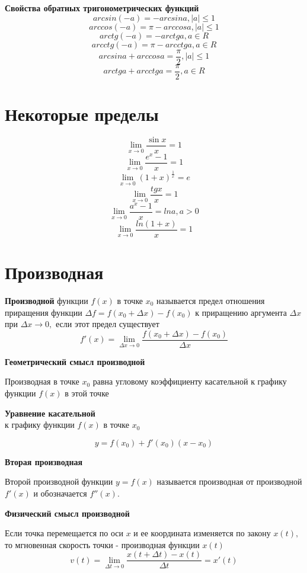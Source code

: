 \documentclass[a5paper, 8pt]{extarticle}
\begin{document}
\textbf{Свойства обратных тригонометрических функций}
$$arcsin(-a)=-arcsin a, |a|\le 1$$
$$arccos(-a)=\pi-arccos a, |a|\le 1$$
$$arctg(-a)=-arctg a, a\in R$$
$$arcctg(-a)=\pi-arcctg a, a\in R$$
$$arcsin a+ arccos a=\frac{\pi}{2}, |a|\le 1$$
$$arctg a+ arcctg a=\frac{\pi}{2}, a\in R$$

\section{Некоторые пределы}
$$\lim\limits_{x\to 0}\frac{\sin x}{x}=1$$
$$\lim\limits_{x\to 0}\frac{e^x-1}{x}=1$$
$$\lim\limits_{x\to 0}(1+x)^{\frac{1}{x}}=e$$
$$\lim\limits_{x\to 0}\frac{tg x}{x}=1$$
$$\lim\limits_{x\to 0}\frac{a^x-1}{x}=ln a, a>0$$
$$\lim\limits_{x\to 0}\frac{ln(1+x)}{x}=1$$

\section{Производная}

\textbf{Производной} функции $f(x)$  в точке $x_0$ называется  предел отношения приращения функции $\Delta f=f(x_0+\Delta x)-f(x_0)$ к приращению аргумента $\Delta x$ при $\Delta x\to 0,$ если этот предел существует
$$
f'(x)=\lim\limits_{\Delta x\to 0}\frac{f(x_0+\Delta x)-f(x_0)}{\Delta x}
$$

\begin{center}
\textbf{Геометрический смысл производной}
\end{center}
Производная в точке $x_0$ равна угловому коэффициенту касательной
к графику функции $f(x)$ в этой точке

\begin{center}
\textbf{Уравнение касательной}\\
к графику функции $f(x)$ в точке $x_0$
\end{center}
$$y=f(x_0)+f'(x_0)(x-x_0)$$

\begin{center}
\textbf{Вторая производная}
\end{center}

Второй производной функции $y=f(x)$ называется производная от производной $f'(x)$  и обозначается $f''(x).$

\begin{center}
\textbf{Физический смысл производной}
\end{center}
Если точка перемещается по оси $x$ и ее координата изменяется по закону $x(t),$ то мгновенная скорость точки - производная функции $x(t)$ 
$$
v(t)=\lim\limits_{\Delta t\to 0}\frac{x(t+\Delta t)-x(t)}{\Delta t}=x'(t)
$$
\end{document}
